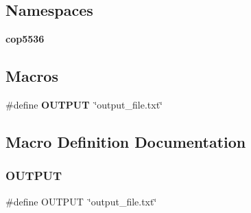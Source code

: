 \subsection*{Namespaces}
\begin{DoxyCompactItemize}
\item 
 \textbf{ cop5536}
\end{DoxyCompactItemize}
\subsection*{Macros}
\begin{DoxyCompactItemize}
\item 
\#define \textbf{ O\+U\+T\+P\+UT}~\char`\"{}output\+\_\+file.\+txt\char`\"{}
\end{DoxyCompactItemize}


\subsection{Macro Definition Documentation}
\mbox{\label{bp__tree_8h_a61a3c9a18380aafb6e430e79bf596557}} 
\subsubsection{OUTPUT}
{\footnotesize\ttfamily \#define O\+U\+T\+P\+UT~\char`\"{}output\+\_\+file.\+txt\char`\"{}}


